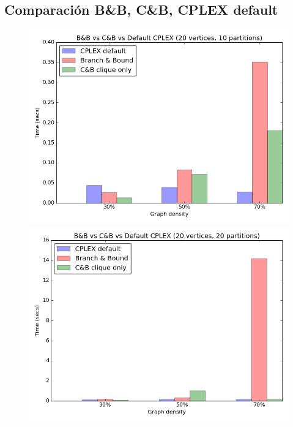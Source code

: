 \pagebreak

\subsection{Comparación B\&B, C\&B, CPLEX default}

\begin{figure}[h]
  \centering
  \begin{minipage}[b]{0.49\textwidth}
    \includegraphics[width=\textwidth]{img/8-compare_v20_p10_i1_l40_t1_b0.png}
  \end{minipage}
  \hfill
  \begin{minipage}[b]{0.49\textwidth}
    \includegraphics[width=\textwidth]{img/8-compare_v20_p20_i1_l40_t1_b0.png}

\end{minipage}
\end{figure}
